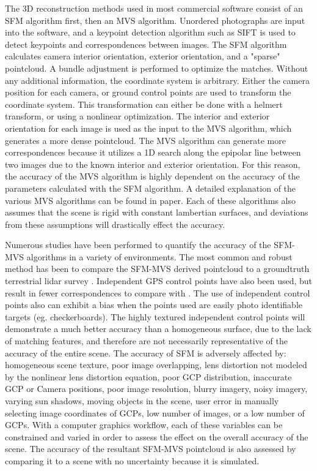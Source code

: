 The 3D reconstruction methods used in most commercial software consist of an SFM algorithm first, then an MVS algorithm.  Unordered photographs are input into the software, and a keypoint detection algorithm such as SIFT is used to detect keypoints and correspondences between images.  The SFM algorithm calculates camera interior orientation, exterior orientation, and a "sparse" pointcloud.  A bundle adjustment is performed to optimize the matches.  Without any additional information, the coordinate system is arbitrary.  Either the camera position for each camera, or ground control points are used to transform the coordinate system.  This transformation can either be done with a helmert transform,  or using a nonlinear optimization.  The interior and exterior orientation for each image is used as the input to the MVS algorithm, which generates a more dense pointcloud.  The MVS algorithm can generate more correspondences because it utilizes a 1D search along the epipolar line between two images due to the known interior and exterior orientation.  For this reason, the accuracy of the MVS algorithm is highly dependent on the accuracy of the parameters calculated with the SFM algorithm.  A detailed explanation of the various MVS algorithms can be found in paper.  Each of these algorithms also assumes that the scene is rigid with constant lambertian surfaces, and deviations from these assumptions will drastically effect the accuracy. 

Numerous studies have been performed to quantify the accuracy of the SFM-MVS algorithms in a variety of environments.  The most common and robust method has been to compare the SFM-MVS derived pointcloud to a groundtruth terrestrial lidar survey .  Independent GPS control points have also been used, but result in fewer correspondences to compare with .  The use of independent control points also can exhibit a bias when the points used are easily photo identifiable targets (eg. checkerboards).  The highly textured independent control points will demonstrate a much better accuracy than a homogeneous surface, due to the lack of matching features, and therefore are not necessarily representative of the accuracy of the entire scene.  The accuracy of SFM is adversely affected by: homogeneous scene texture, poor image overlapping, lens distortion not modeled by the nonlinear lens distortion equation, poor GCP distribution, inaccurate GCP or Camera positions, poor image resolution, blurry imagery, noisy imagery, varying sun shadows, moving objects in the scene, user error in manually selecting image coordinates of GCPs, low number of images, or a low number of GCPs.  With a computer graphics workflow, each of these variables can be constrained and varied in order to assess the effect on the overall accuracy of the scene.  The accuracy of the resultant SFM-MVS pointcloud is also assessed by comparing it to a scene with no uncertainty because it is simulated.  

